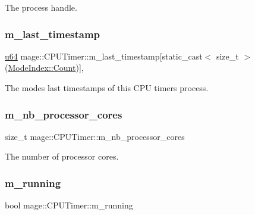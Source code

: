 The process handle. \hypertarget{classmage_1_1_c_p_u_timer_a49e9a8e9684d38bdfca5f4c343de5680}{}\label{classmage_1_1_c_p_u_timer_a49e9a8e9684d38bdfca5f4c343de5680} 
\subsubsection{\texorpdfstring{m\+\_\+last\+\_\+timestamp}{m\_last\_timestamp}}
{\footnotesize\ttfamily \hyperlink{namespacemage_aee97da48a07394dd617c9deb60ed2064}{u64} mage\+::\+C\+P\+U\+Timer\+::m\+\_\+last\+\_\+timestamp\mbox{[}static\+\_\+cast$<$ size\+\_\+t $>$(\hyperlink{classmage_1_1_c_p_u_timer_a98d59db3c396b14269c937e016c7625eae93f994f01c537c4e2f7d8528c3eb5e9}{Mode\+Index\+::\+Count})\mbox{]}\hspace{0.3cm}{\ttfamily [mutable]}, {\ttfamily [private]}}

The modes\textquotesingle{} last timestamps of this C\+PU timer\textquotesingle{}s process. \hypertarget{classmage_1_1_c_p_u_timer_ac5fdb38a70c74815231b5efd8d746be1}{}\label{classmage_1_1_c_p_u_timer_ac5fdb38a70c74815231b5efd8d746be1} 
\subsubsection{\texorpdfstring{m\+\_\+nb\+\_\+processor\+\_\+cores}{m\_nb\_processor\_cores}}
{\footnotesize\ttfamily size\+\_\+t mage\+::\+C\+P\+U\+Timer\+::m\+\_\+nb\+\_\+processor\+\_\+cores\hspace{0.3cm}{\ttfamily [private]}}

The number of processor cores. \hypertarget{classmage_1_1_c_p_u_timer_a7190afa453085b7bbd7cb76ff6bb62f2}{}\label{classmage_1_1_c_p_u_timer_a7190afa453085b7bbd7cb76ff6bb62f2} 
\subsubsection{\texorpdfstring{m\+\_\+running}{m\_running}}
{\footnotesize\ttfamily bool mage\+::\+C\+P\+U\+Timer\+::m\+\_\+running\hspace{0.3cm}{\ttfamily [private]}}

